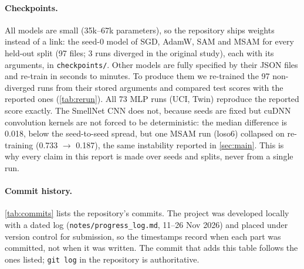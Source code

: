 \documentclass[10pt,twocolumn,letterpaper]{article}
\begin{document}
\paragraph{Checkpoints.} All models are small (35k--67k parameters), so the repository ships weights instead of a
link: the seed-0 model of SGD, AdamW, SAM and MSAM for every held-out split (97 files; 3 runs diverged in the original study), each with its arguments, in
\texttt{checkpoints/}. Other models are fully specified by their JSON files and re-train in seconds to minutes.
To produce them we re-trained the 97 non-diverged runs from their stored arguments and compared test scores with
the reported ones (\cref{tab:rerun}). All 73 MLP runs (UCI, Twin) reproduce the reported score exactly. The SmellNet
CNN does not, because seeds are fixed but cuDNN convolution kernels are not forced to be deterministic: the median
difference is 0.018, below the seed-to-seed spread, but one MSAM run (loso6) collapsed on re-training (0.733
$\rightarrow$ 0.187), the same instability reported in \cref{sec:main}. This is why every claim in this report is
made over seeds and splits, never from a single run.

\begin{table}[t]
\centering\small

\caption{Re-training check of the 97 shipped checkpoints: absolute difference between the re-trained and the
reported test score (macro-F1; $R^2$ for Twin concentration), next to the median standard deviation over seeds of
the same runs. Generated by \texttt{scripts/report/make\_repro\_tex.py} from \texttt{checkpoints/manifest.csv}.}
\label{tab:rerun}
\end{table}

\paragraph{Commit history.} \cref{tab:commits} lists the repository's commits. The project was developed locally
with a dated log (\texttt{notes/progress\_log.md}, 11--26 Nov 2026) and placed under version control for submission,
so the timestamps record when each part was committed, not when it was written. The commit that adds this table
follows the ones listed; \texttt{git log} in the repository is authoritative.

\begin{table}[t]
\centering\footnotesize

\caption{Commits in the project repository (short hash, date and time, author, content). Generated from \texttt{git log}.}
\label{tab:commits}
\end{table}
\end{document}
